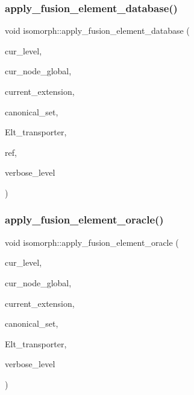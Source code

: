 \subsubsection{\texorpdfstring{apply\+\_\+fusion\+\_\+element\+\_\+database()}{apply\_fusion\_element\_database()}}
{\footnotesize\ttfamily void isomorph\+::apply\+\_\+fusion\+\_\+element\+\_\+database (\begin{DoxyParamCaption}\item[{\mbox{\hyperlink{galois_8h_a09fddde158a3a20bd2dcadb609de11dc}{I\+NT}}}]{cur\+\_\+level,  }\item[{\mbox{\hyperlink{galois_8h_a09fddde158a3a20bd2dcadb609de11dc}{I\+NT}}}]{cur\+\_\+node\+\_\+global,  }\item[{\mbox{\hyperlink{galois_8h_a09fddde158a3a20bd2dcadb609de11dc}{I\+NT}}}]{current\+\_\+extension,  }\item[{\mbox{\hyperlink{galois_8h_a09fddde158a3a20bd2dcadb609de11dc}{I\+NT}} $\ast$}]{canonical\+\_\+set,  }\item[{\mbox{\hyperlink{galois_8h_a09fddde158a3a20bd2dcadb609de11dc}{I\+NT}} $\ast$}]{Elt\+\_\+transporter,  }\item[{\mbox{\hyperlink{galois_8h_a09fddde158a3a20bd2dcadb609de11dc}{I\+NT}}}]{ref,  }\item[{\mbox{\hyperlink{galois_8h_a09fddde158a3a20bd2dcadb609de11dc}{I\+NT}}}]{verbose\+\_\+level }\end{DoxyParamCaption})}

\mbox{\label{classisomorph_ac8f7bb76db1ce5fa9a34f2ac50f221e1}} 
\subsubsection{\texorpdfstring{apply\+\_\+fusion\+\_\+element\+\_\+oracle()}{apply\_fusion\_element\_oracle()}}
{\footnotesize\ttfamily void isomorph\+::apply\+\_\+fusion\+\_\+element\+\_\+oracle (\begin{DoxyParamCaption}\item[{\mbox{\hyperlink{galois_8h_a09fddde158a3a20bd2dcadb609de11dc}{I\+NT}}}]{cur\+\_\+level,  }\item[{\mbox{\hyperlink{galois_8h_a09fddde158a3a20bd2dcadb609de11dc}{I\+NT}}}]{cur\+\_\+node\+\_\+global,  }\item[{\mbox{\hyperlink{galois_8h_a09fddde158a3a20bd2dcadb609de11dc}{I\+NT}}}]{current\+\_\+extension,  }\item[{\mbox{\hyperlink{galois_8h_a09fddde158a3a20bd2dcadb609de11dc}{I\+NT}} $\ast$}]{canonical\+\_\+set,  }\item[{\mbox{\hyperlink{galois_8h_a09fddde158a3a20bd2dcadb609de11dc}{I\+NT}} $\ast$}]{Elt\+\_\+transporter,  }\item[{\mbox{\hyperlink{galois_8h_a09fddde158a3a20bd2dcadb609de11dc}{I\+NT}}}]{verbose\+\_\+level }\end{DoxyParamCaption})}

